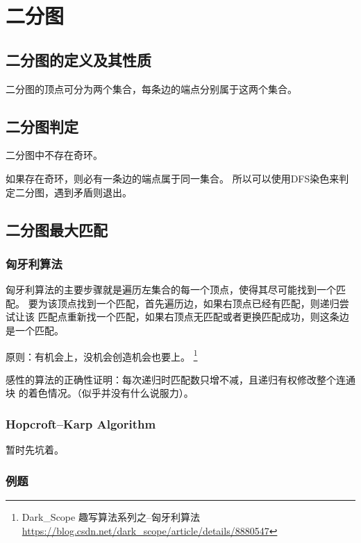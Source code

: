 \section{二分图}
\subsection{二分图的定义及其性质}
二分图的顶点可分为两个集合，每条边的端点分别属于这两个集合。
\subsection{二分图判定}
\begin{property}
	二分图中不存在奇环。
\end{property}
如果存在奇环，则必有一条边的端点属于同一集合。
所以可以使用DFS染色来判定二分图，遇到矛盾则退出。



\subsection{二分图最大匹配}

\subsubsection{匈牙利算法}

匈牙利算法的主要步骤就是遍历左集合的每一个顶点，使得其尽可能找到一个匹配。
要为该顶点找到一个匹配，首先遍历边，如果右顶点已经有匹配，则递归尝试让该
匹配点重新找一个匹配，如果右顶点无匹配或者更换匹配成功，则这条边是一个匹配。

原则：有机会上，没机会创造机会也要上。
\footnote{Dark\_Scope 趣写算法系列之--匈牙利算法
	\url{https://blog.csdn.net/dark\_scope/article/details/8880547}}

感性的算法的正确性证明：每次递归时匹配数只增不减，且递归有权修改整个连通块
的着色情况。（似乎并没有什么说服力）。


\subsubsection{Hopcroft–Karp Algorithm}
暂时先坑着。

\subsubsection{例题}

